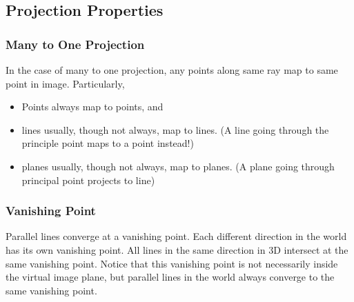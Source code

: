 \documentclass[11pt]{article}
\begin{document}
\subsection{Projection Properties}
\subsubsection{Many to One Projection}
In the case of many to one projection, any points along same ray map to same point in image. Particularly,
\begin{itemize}
	\item Points always map to points, and 
	\item lines usually, though not always, map to lines. (A line going through the principle point maps to a point instead!)  
	\item planes usually, though not always, map to planes. (A plane going through principal point projects to line)
\end{itemize}

\subsubsection{Vanishing Point}
Parallel lines converge at a vanishing point. Each different direction in the world has its own vanishing point. All lines in the same direction in 3D intersect at the same vanishing point. Notice that this vanishing point is not necessarily inside the virtual image plane, but parallel lines in the world always converge to the same vanishing point. 
\end{document}
